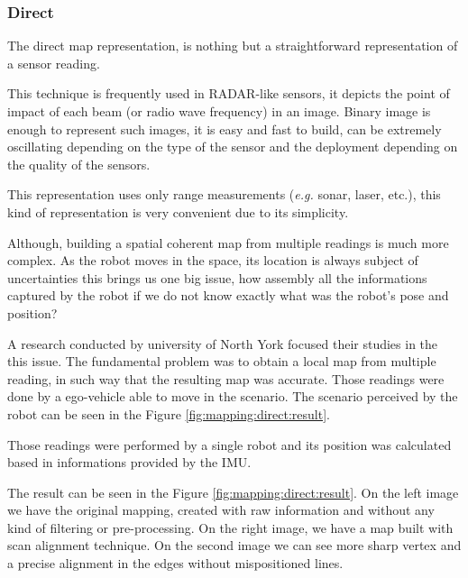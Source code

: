 \subsubsection{Direct}

The direct map representation, is nothing but a straightforward representation of a sensor reading. 

This technique is frequently used in RADAR-like sensors, it depicts the point of impact of each beam (or radio wave frequency) in an image. Binary image is enough to represent such images, it is easy and fast to build, can be extremely oscillating depending on the type of the sensor and the deployment depending on the quality of the sensors.

This representation uses only range measurements (\textit{e.g.} sonar, laser, etc.), this kind of representation is very convenient due to its simplicity. 

Although, building a spatial coherent map from multiple readings is much more complex. As the robot moves in the space, its location is always subject of uncertainties this brings us one big issue, how assembly all the informations captured by the robot if we do not know exactly what was the robot's pose and position? 

A research conducted by university of North York\cite{Lu:1997:GCR:591441.591464} focused their studies in the this issue. The fundamental problem was to obtain a local map from multiple reading, in such way that the resulting map was accurate. Those readings were done by a ego-vehicle able to move in the scenario. The scenario perceived by the robot can be seen in the Figure \ref{fig:mapping:direct:result}.

Those readings were performed by a single robot and its position was calculated based in informations provided by the IMU.

The result can be seen in the Figure \ref{fig:mapping:direct:result}. On the left image we have the original mapping, created with raw information and without any kind of filtering or pre-processing. On the right image, we have a map built with scan alignment technique\cite{Lu:1997:GCR:591441.591464}. On the second image we can see more sharp vertex and a precise alignment in the edges without mispositioned lines.

